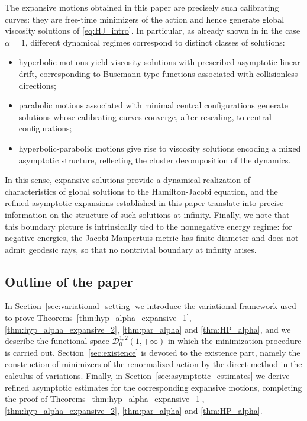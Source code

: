 \documentclass[a4paper,10pt]{amsart}
\theoremstyle{plain}
\theoremstyle{definition}
\numberwithin{equation}{section}
\numberwithin{thm}{section}
\begin{document}
The expansive motions obtained in this paper are precisely such calibrating curves: they are free-time minimizers of the action and hence generate global viscosity solutions of \eqref{eq:HJ_intro}. In particular, as already shown in \cite{BertiPolimeniTerracini} in the case $\alpha=1$, different dynamical regimes correspond to distinct classes of solutions:
\begin{itemize}
\item hyperbolic motions yield viscosity solutions with prescribed asymptotic linear drift, corresponding to Busemann-type functions associated with collisionless directions;
\item parabolic motions associated with minimal central configurations generate solutions whose calibrating curves converge, after rescaling, to central configurations;
\item hyperbolic-parabolic motions give rise to viscosity solutions encoding a mixed asymptotic structure, reflecting the cluster decomposition of the dynamics.
\end{itemize}

In this sense, expansive solutions provide a dynamical realization of characteristics of global solutions to the Hamilton-Jacobi equation, and the refined asymptotic expansions established in this paper translate into precise information on the structure of such solutions at infinity. Finally, we note that this boundary picture is intrinsically tied to the nonnegative energy regime: for negative energies, the Jacobi-Maupertuis metric has finite diameter and does not admit geodesic rays, so that no nontrivial boundary at infinity arises.



\subsection{Outline of the paper}
In Section~\ref{sec:variational_setting} we introduce the variational framework used to prove Theorems~\ref{thm:hyp_alpha_expansive_1}, \ref{thm:hyp_alpha_expansive_2}, \ref{thm:par_alpha} and \ref{thm:HP_alpha}, and we describe the functional space $\mathcal{D}_0^{1,2}(1,+\infty)$ in which the minimization procedure is carried out.
Section~\ref{sec:existence} is devoted to the existence part, namely the construction of minimizers of the renormalized action by the direct method in the calculus of variations.
Finally, in Section~\ref{sec:asymptotic_estimates} we derive refined asymptotic estimates for the corresponding expansive motions, completing the proof of Theorems~\ref{thm:hyp_alpha_expansive_1}, \ref{thm:hyp_alpha_expansive_2}, \ref{thm:par_alpha} and \ref{thm:HP_alpha}.
\end{document}
